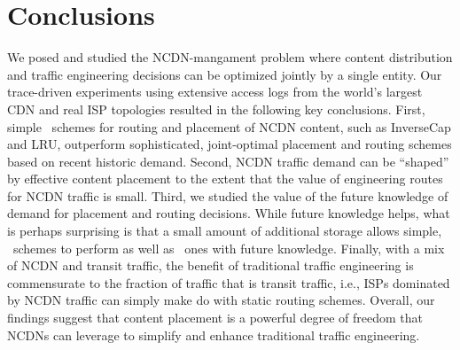 \section{Conclusions}
\label{sec:concl}


We posed and studied the NCDN-mangament problem where content distribution and traffic engineering decisions can be optimized jointly by a single entity. %
Our trace-driven experiments using extensive access logs from the world's largest CDN and real ISP topologies resulted in the following key conclusions. First, simple \unplanned\ schemes for routing and placement of NCDN content, such as InverseCap and LRU, outperform sophisticated, joint-optimal placement and routing schemes based on recent historic demand. Second,  NCDN traffic demand can be ``shaped'' by effective content placement to the extent that the value of engineering routes for NCDN traffic is small.  Third, we studied the value of the future knowledge of demand for placement and routing decisions. While future knowledge helps, what is perhaps surprising is that a small amount of additional storage allows simple, \unplanned\ schemes to perform as well as \planned\ ones with future knowledge. Finally, with a mix of NCDN and transit traffic, the benefit of traditional traffic engineering is commensurate to the fraction of traffic that is transit traffic, i.e., ISPs dominated by NCDN traffic can simply make do with static routing schemes.  Overall, our findings suggest that content placement is a powerful degree of freedom that NCDNs can leverage to simplify and enhance traditional traffic engineering.





